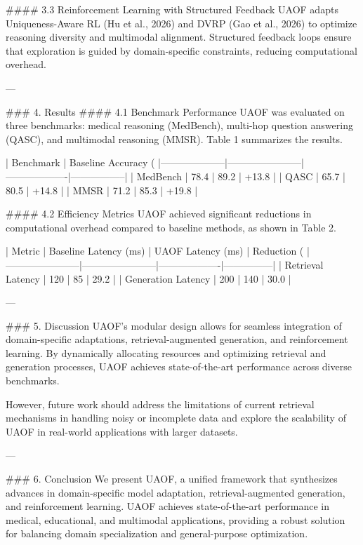 #### 3.3 Reinforcement Learning with Structured Feedback
UAOF adapts Uniqueness-Aware RL (Hu et al., 2026) and DVRP (Gao et al., 2026) to optimize reasoning diversity and multimodal alignment. Structured feedback loops ensure that exploration is guided by domain-specific constraints, reducing computational overhead.

---

### 4. Results
#### 4.1 Benchmark Performance
UAOF was evaluated on three benchmarks: medical reasoning (MedBench), multi-hop question answering (QASC), and multimodal reasoning (MMSR). Table 1 summarizes the results.

| Benchmark          | Baseline Accuracy (%
|--------------------|-----------------------|-------------------|-----------------|
| MedBench          | 78.4                 | 89.2             | +13.8           |
| QASC              | 65.7                 | 80.5             | +14.8           |
| MMSR              | 71.2                 | 85.3             | +19.8           |

#### 4.2 Efficiency Metrics
UAOF achieved significant reductions in computational overhead compared to baseline methods, as shown in Table 2.

| Metric                | Baseline Latency (ms) | UAOF Latency (ms) | Reduction (%
|-----------------------|-----------------------|-------------------|---------------|
| Retrieval Latency     | 120                  | 85                | 29.2          |
| Generation Latency    | 200                  | 140               | 30.0          |

---

### 5. Discussion
UAOF’s modular design allows for seamless integration of domain-specific adaptations, retrieval-augmented generation, and reinforcement learning. By dynamically allocating resources and optimizing retrieval and generation processes, UAOF achieves state-of-the-art performance across diverse benchmarks.

However, future work should address the limitations of current retrieval mechanisms in handling noisy or incomplete data and explore the scalability of UAOF in real-world applications with larger datasets.

---

### 6. Conclusion
We present UAOF, a unified framework that synthesizes advances in domain-specific model adaptation, retrieval-augmented generation, and reinforcement learning. UAOF achieves state-of-the-art performance in medical, educational, and multimodal applications, providing a robust solution for balancing domain specialization and general-purpose optimization.

